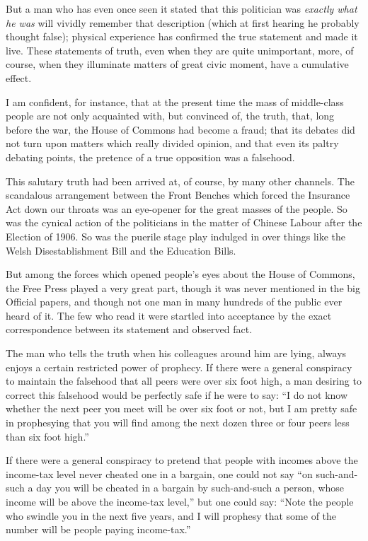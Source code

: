 \documentclass{book}
\begin{document}
But a man who has even once seen it stated that this politician was \emph{exactly what he was} will vividly remember that description (which at first hearing he probably thought false); physical experience has confirmed the true statement and made it live. These statements of truth, even when they are quite unimportant, more, of course, when they illuminate matters of great civic moment, have a cumulative effect.

I am confident, for instance, that at the present time the mass of middle-class people are not only acquainted with, but convinced of, the truth, that, long before the war, the House of Commons had become a fraud; that its debates did not turn upon matters which really divided opinion, and that even its paltry debating points, the pretence of a true opposition was a falsehood.

This salutary truth had been arrived at, of course, by many other channels. The scandalous arrangement between the Front Benches which forced the Insurance Act down our throats was an eye-opener for the great masses of the people. So was the cynical action of the politicians in the matter of Chinese Labour after the Election of 1906. So was the puerile stage play indulged in over things like the Welsh Disestablishment Bill and the Education Bills.

But among the forces which opened people’s eyes about the House of Commons, the Free Press played a very great part, though it was never mentioned in the big Official papers, and though not one man in many hundreds of the public ever heard of it. The few who read it were startled into acceptance by the exact correspondence between its statement and observed fact.

The man who tells the truth when his colleagues around him are lying, always enjoys a certain restricted power of prophecy. If there were a general conspiracy to maintain the falsehood that all peers were over six foot high, a man desiring to correct this falsehood would be perfectly safe if he were to say: “I do not know whether the next peer you meet will be over six foot or not, but I am pretty safe in prophesying that you will find among the next dozen three or four peers less than six foot high.”

If there were a general conspiracy to pretend that people with incomes above the income-tax level never cheated one in a bargain, one could not say “on such-and-such a day you will be cheated in a bargain by such-and-such a person, whose income will be above the income-tax level,” but one could say: “Note the people who swindle you in the next five years, and I will prophesy that some of the number will be people paying income-tax.”
\end{document}
